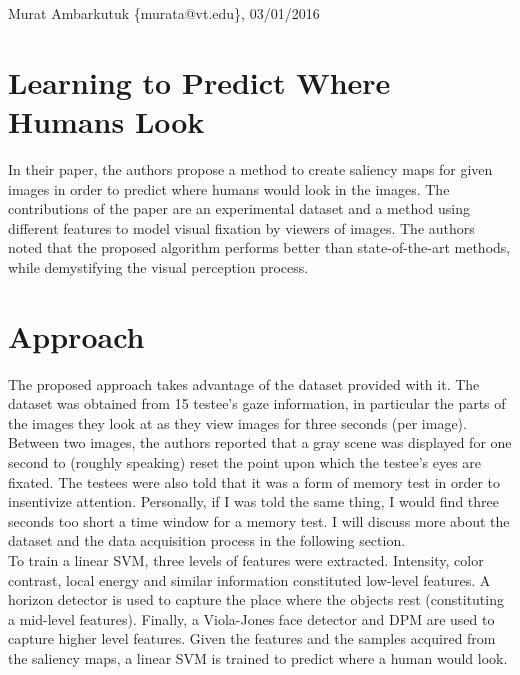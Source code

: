 \documentclass[11pt]{article}
\begin{document}
\thispagestyle{empty}
\begin{flushright}
	\small{Murat Ambarkutuk \{murata@vt.edu\}, 03/01/2016}
\end{flushright}
\section{Learning to Predict Where Humans Look}
In their paper, the authors propose a method to create saliency maps for given images in order to predict where humans would look in the images.
The contributions of the paper are an experimental dataset and a method using different features to model visual fixation by viewers of images.
The authors noted that the proposed algorithm performs better than state-of-the-art methods, while demystifying the visual perception process.
\section{Approach}
\indent The proposed approach takes advantage of the dataset provided with it.
The dataset was obtained from 15 testee's gaze information, in particular the parts of the images they look at as they view images for three seconds (per image).
Between two images, the authors reported that a gray scene was displayed for one second to (roughly speaking) reset the point upon which the testee's eyes are fixated.
The testees were also told that it was a form of memory test in order to insentivize attention.
Personally, if I was told the same thing, I would find three seconds too short a time window for a memory test.
I will discuss more about the dataset and the data acquisition process in the following section. \\
\indent To train a linear SVM, three levels of features were extracted.
Intensity, color contrast, local energy and similar information constituted low-level features.
A horizon detector is used to capture the place where the objects rest (constituting a mid-level features).
Finally, a Viola-Jones face detector and DPM are used to capture higher level features.
Given the features and the samples acquired from the saliency maps, a linear SVM is trained to predict where a human would look.
\end{document}
